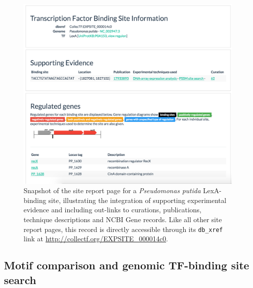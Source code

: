\begin{figure}
  \centering
  \includegraphics[width=\textwidth]{figures/chapter2/individual-site}
  \caption[Snapshot of the site report page for a \textit{Pseudomonas putida}
  LexA-binding site.]{Snapshot of the site report page for a
    \textit{Pseudomonas putida} LexA-binding site, illustrating the integration
    of supporting experimental evidence and including out-links to curations,
    publications, technique descriptions and NCBI Gene records. Like all other
    site report pages, this record is directly accessible through its
    \texttt{db\_xref} link at \url{http://collectf.org/EXPSITE_000014c0}.}
\label{fig:individual-site}
\end{figure}

\subsection{Motif comparison and genomic TF-binding site search}

